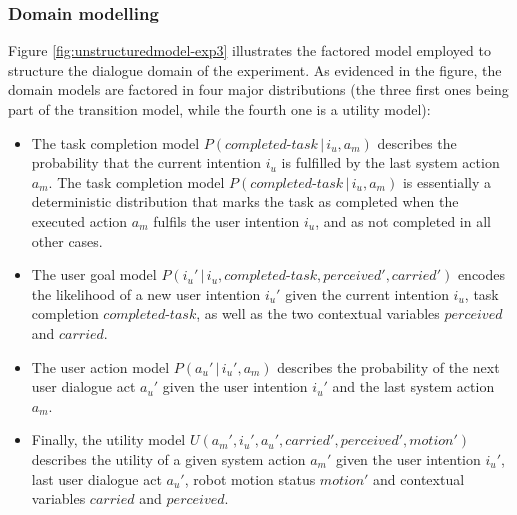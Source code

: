 \subsubsection*{Domain modelling}

Figure \ref{fig:unstructuredmodel-exp3} illustrates the factored model employed to structure the dialogue domain of the experiment.  As evidenced in the figure, the domain models are factored in four major distributions (the three first ones being part of the transition model, while the fourth one is a utility model): 
\begin{itemize}
\item The task completion model $P(\mathit{completed\mbox{-}task}\, | \, i_u, a_m)$ describes the probability that the current intention $i_u$ is fulfilled by the last system action $a_m$.  The task completion model $P(\mathit{completed\mbox{-}task}\, | \, i_u, a_m)$ is essentially a deterministic distribution that marks the task as completed when the executed action $a_m$ fulfils the user intention $i_u$,  and as not completed in all other cases. %
\item The user goal model $P(i_u' \, | \, i_u, \mathit{completed\mbox{-}task}, \mathit{perceived'}, \mathit{carried'})$ encodes the likelihood of a new user intention $i_u'$ given the current intention $i_u$, task completion $\mathit{completed\mbox{-}task}$, as well as the two contextual variables $\mathit{perceived}$ and $\mathit{carried}$. 
\item The user action model $P(a_u'\, | \, i_u', a_m)$ describes the probability of the next user dialogue act $a_u'$ given the user intention $i_u'$ and the last system action $a_m$.
\item Finally, the utility model $U(a_m', i_u', a_u', \mathit{carried'}, \mathit{perceived'}, \mathit{motion'})$ describes the utility of a given system action $a_m'$ given the user intention $i_u'$, last user dialogue act $a_u'$, robot motion status $\mathit{motion'}$ and contextual variables $\mathit{carried}$ and $\mathit{perceived}$. 
\end{itemize}


